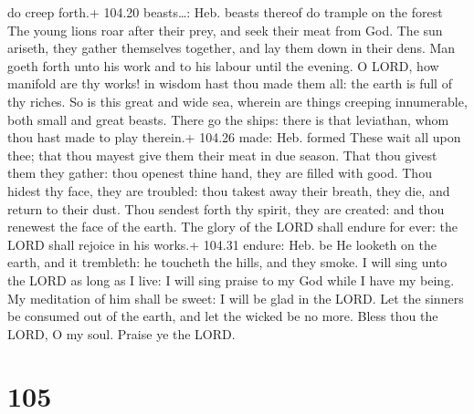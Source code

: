 do creep forth.+ 104.20 beasts\ldots: Heb. beasts thereof do trample on
the forest  The young lions roar after their prey, and seek
their meat from God.  The sun ariseth, they gather
themselves together, and lay them down in their dens.  Man
goeth forth unto his work and to his labour until the evening.
 O LORD, how manifold are thy works! in wisdom hast thou
made them all: the earth is full of thy riches.  So is this
great and wide sea, wherein are things creeping innumerable, both small
and great beasts.  There go the ships: there is that
leviathan, whom thou hast made to play therein.+ 104.26 made: Heb.
formed  These wait all upon thee; that thou mayest give
them their meat in due season.  That thou givest them they
gather: thou openest thine hand, they are filled with good.
 Thou hidest thy face, they are troubled: thou takest away
their breath, they die, and return to their dust.  Thou
sendest forth thy spirit, they are created: and thou renewest the face
of the earth.  The glory of the LORD shall endure for ever:
the LORD shall rejoice in his works.+ 104.31 endure: Heb. be
 He looketh on the earth, and it trembleth: he toucheth the
hills, and they smoke.  I will sing unto the LORD as long
as I live: I will sing praise to my God while I have my being.
 My meditation of him shall be sweet: I will be glad in the
LORD.  Let the sinners be consumed out of the earth, and
let the wicked be no more. Bless thou the LORD, O my soul. Praise ye the
LORD.

\hypertarget{section-104}{%
\section{105}\label{section-104}}

